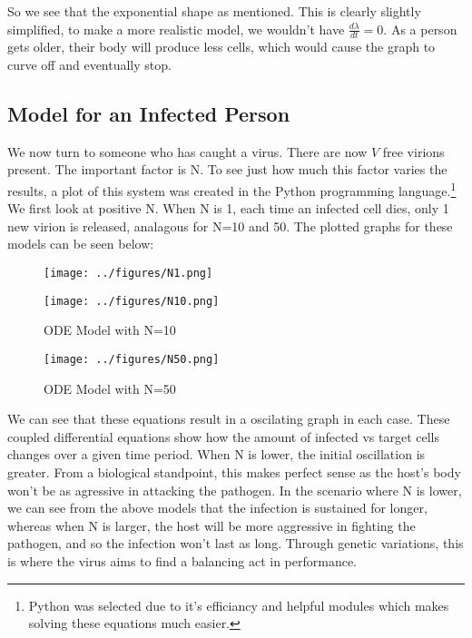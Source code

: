 \newpage

So we see that the exponential shape as mentioned. This is clearly slightly simplified, to make a more realistic model, we wouldn't have $\frac{d \lambda}{dt} = 0$. As a person gets older, their body will produce less cells, which would cause the graph to curve off and eventually stop. \\

\subsection{Model for an Infected Person}
We now turn to someone who has caught a virus. There are now $V$ free virions present. The important factor is N. To see just how much this factor varies the results, a plot of this system was created in the Python programming language.\footnote{Python was selected due to it's efficiancy and helpful modules which makes solving these equations much easier.} \\

We first look at positive N. When N is 1, each time an infected cell dies, only 1 new virion is released, analagous for N=10 and 50. The plotted graphs for these models can be seen below:

\begin{figure}[h]
    \centering
    \begin{minipage}[b]{0.4\textwidth}
        \texttt{[image: ../figures/N1.png]}
        \caption{ODE Model with N=1}%
    \end{minipage}
    \hfill
    \centering
    \begin{minipage}[b] {0.4\textwidth}   
        \texttt{[image: ../figures/N10.png]}
        \caption{ODE Model with N=10}%
    \end{minipage}
\end{figure}

\begin{figure}[h]
    \centering
    \texttt{[image: ../figures/N50.png]}
    \caption{ODE Model with N=50}%
\end{figure}

We can see that these equations result in a oscilating graph in each case. These coupled differential equations show how the amount of infected vs target cells changes over a given time period. When N is lower, the initial oscillation is greater. From a biological standpoint, this makes perfect sense as the host's body won't be as agressive in attacking the pathogen. In the scenario where N is lower, we can see from the above models that the infection is sustained for longer, whereas when N is larger, the host will be more aggressive in fighting the pathogen, and so the infection won't last as long. Through genetic variations, this is where the virus aims to find a balancing act in performance. \\

